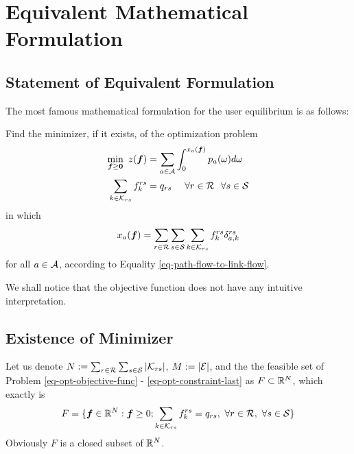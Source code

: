 \documentclass{article}
\begin{document}
\section{Equivalent Mathematical Formulation}

\subsection{Statement of Equivalent Formulation}

The most famous mathematical formulation for the user equilibrium is as follows:

\begin{prob} \label{prob-min-formulation}
    Find the minimizer, if it exists, of the optimization problem
    \begin{align} \label{eq-opt-objective-func}
        \min_{\boldsymbol{f} \ge \boldsymbol{0}}~ z(\boldsymbol{f}) &= \sum_{a \in \mathcal{A}} \int_0^{x_a (\boldsymbol{f})} p_a (\omega) d \omega \\ 
        \sum_{k \in \mathcal{K}_{rs}} f_{k}^{rs} &= q_{rs} ~~~~ \forall r \in \mathcal{R} ~~ \forall s \in \mathcal{S} \label{eq-opt-constraint-last}
    \end{align}
    in which 
    $$ x_a (\boldsymbol{f}) = \sum_{r \in \mathcal{R}} \sum_{s \in \mathcal{S}} \sum_{k \in \mathcal{K}_{rs}} f_{k}^{rs} \delta_{a, k}^{rs} $$
    for all $ a \in \mathcal{A} $, according to Equality \ref{eq-path-flow-to-link-flow}.
\end{prob}

We shall notice that the objective function does not have any intuitive interpretation.

\subsection{Existence of Minimizer}
 
Let us denote $ N := \sum_{r \in \mathcal{R}} \sum_{s \in \mathcal{S}} \abs{\mathcal{K}_{rs}} $, $ M := \abs{\mathcal{E}} $, and the the feasible set of Problem \ref{eq-opt-objective-func} - \ref{eq-opt-constraint-last} as $ F \subset \mathbb{R}^N $, which exactly is
$$ F = \{ \boldsymbol{f} \in \mathbb{R}^N : \boldsymbol{f} \ge 0; \sum_{k \in \mathcal{K}_{rs}} f_{k}^{rs} = q_{rs}, ~\forall r \in \mathcal{R}, ~\forall s \in \mathcal{S} \} $$
Obviously $ F $ is a closed subset of $ \mathbb{R}^N $. 
\end{document}
